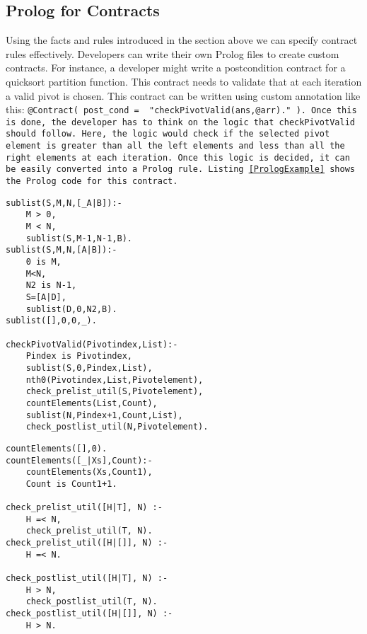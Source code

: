 \subsection{Prolog for Contracts}

Using the facts and rules introduced in the section above we can specify contract rules effectively. Developers can write their own Prolog files to create custom contracts. For instance, a developer might write a postcondition contract for a quicksort partition function. This contract needs to validate that at each iteration a valid pivot is chosen. This contract can be written using custom annotation like this: \tt{@Contract( post\_cond = { "checkPivotValid(ans,@arr)." })}. 
Once this is done, the developer has to think on the logic that \tt{checkPivotValid} should follow. Here, the logic would check if the selected pivot element is greater than all the left elements and less than all the right elements at each iteration. Once this logic is decided, it can be easily converted into a Prolog rule. Listing \ref{PrologExample} shows the Prolog code for this contract.

\begin{minipage}{\linewidth}       
\begin{lstlisting}[frame=single, caption={Prolog example}, label={PrologExample} captionpos=b, breaklines=true]
sublist(S,M,N,[_A|B]):- 
	M > 0, 
	M < N, 
	sublist(S,M-1,N-1,B).	
sublist(S,M,N,[A|B]):- 
	0 is M, 
	M<N, 
	N2 is N-1, 
	S=[A|D], 
	sublist(D,0,N2,B).	
sublist([],0,0,_).

checkPivotValid(Pivotindex,List):-
	Pindex is Pivotindex,
	sublist(S,0,Pindex,List),
	nth0(Pivotindex,List,Pivotelement),
	check_prelist_util(S,Pivotelement),
	countElements(List,Count),
	sublist(N,Pindex+1,Count,List),
	check_postlist_util(N,Pivotelement).
\end{lstlisting}
\end{minipage}

\begin{minipage}{\linewidth}
\begin{lstlisting}[frame=single, caption={Prolog example}, captionpos=b, breaklines=true]
countElements([],0).	
countElements([_|Xs],Count):-
	countElements(Xs,Count1),
	Count is Count1+1.

check_prelist_util([H|T], N) :-
    H =< N,
    check_prelist_util(T, N).	
check_prelist_util([H|[]], N) :-
    H =< N.
	
check_postlist_util([H|T], N) :-
    H > N,
    check_postlist_util(T, N).	
check_postlist_util([H|[]], N) :-
    H > N.
\end{lstlisting}
\end{minipage}


